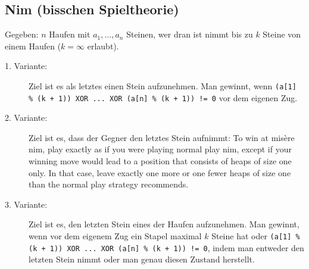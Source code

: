 %

\subsection{Nim (bisschen Spieltheorie)}

Gegeben: \(n\) Haufen mit \(a_1,\ldots,a_n\) Steinen, wer dran ist nimmt bis zu \(k\) Steine von einem Haufen (\(k=\infty\) erlaubt).

\begin{description}
\item[1. Variante:] Ziel ist es als letztes einen Stein aufzunehmen. Man gewinnt, wenn
\lstinline{(a[1] % (k + 1)) XOR ... XOR (a[n] % (k + 1)) != 0} vor dem eigenen Zug.
\item[2. Variante:] Ziel ist es, dass der Gegner den letztes Stein aufnimmt:
To win at mis\`ere nim, play exactly as if you were playing normal play nim, except if your winning move would
lead to a position that consists of heaps of size one only. In that case, leave exactly one more or one fewer
heaps of size one than the normal play strategy recommends.
\item[3. Variante:] Ziel ist es, den letzten Stein eines der Haufen aufzunehmen. Man gewinnt, wenn
vor dem eigenem Zug ein Stapel maximal \(k\) Steine hat oder
\lstinline{(a[1] % (k + 1)) XOR ... XOR (a[n] % (k + 1)) != 0},
indem man entweder den letzten Stein nimmt oder man genau diesen Zustand herstellt.
\end{description}



